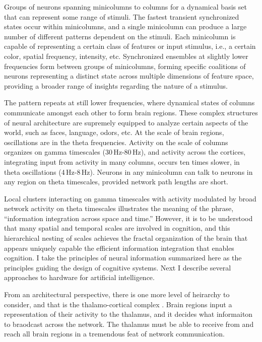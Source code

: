 \documentclass[twocolumn]{article}
\begin{document}
Groups of neurons spanning minicolumns to columns for a dynamical basis set \cite{rahu2008,one_from_reading_group} that can represent some range of stimuli. The fastest transient synchronized states occur within minicolumns, and a single minicolumn can produce a large number of different patterns dependent on the stimuli. Each minicolumn is capable of representing a certain class of features or input stimulus, i.e., a certain color, spatial frequency, intensity, etc. Synchronized ensembles at slightly lower frequencies form between groups of minicolumns, forming specific coalitions of neurons representing a distinct state across multiple dimensions of feature space, providing a broader range of insights regarding the nature of a stimulus. 

The pattern repeats at still lower frequencies, where dynamical states of columns communicate amongst each other to form brain regions. These complex structures of neural architecture are supremely equipped to analyze certain aspects of the world, such as faces, language, odors, etc. At the scale of brain regions, oscillations are in the theta frequencies. Activity on the scale of columns organizes on gamma timescales (30\,Hz-80\,Hz), and activity across the cortices, integrating input from activity in many columns, occurs ten times slower, in theta oscillations (4\,Hz-8\,Hz). Neurons in any minicolumn can talk to neurons in any region on theta timescales, provided network path lengths are short. 

Local clusters interacting on gamma timescales with activity modulated by broad network activity on theta timescales illustrates the meaning of the phrase, ``information integration across space and time.'' However, it is to be understood that many spatial and temporal scales are involved in cognition, and this hierarchical nesting of scales achieves the fractal organization of the brain that appears uniquely capable the efficient information integration that enables cognition. I take the principles of neural information summarized here as the principles guiding the design of cognitive systems. Next I describe several approaches to hardware for artificial intelligence.

\vspace{3em}
From an architectural perspective, there is one more level of heirarchy to consider, and that is the thalamo-cortical complex \cite{}. Brain regions input a representation of their activity to the thalamus, and it decides what informaiton to braodcast across the network. The thalamus must be able to receive from and reach all brain regions in a tremendous feat of network communication.
\end{document}
